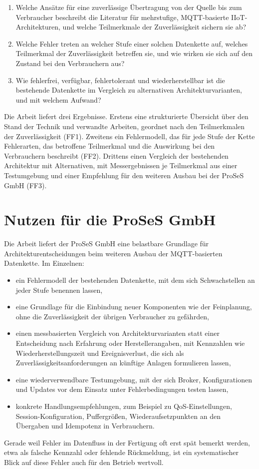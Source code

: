 \documentclass[11pt, a4paper]{article}
\begin{document}
\begin{enumerate}[label=\textbf{FF\arabic*}, leftmargin=*, nosep]
    \item Welche Ansätze für eine zuverlässige Übertragung von der Quelle bis zum Verbraucher beschreibt die Literatur für mehrstufige, MQTT-basierte IIoT-Architekturen, und welche Teilmerkmale der Zuverlässigkeit sichern sie ab?
    \item Welche Fehler treten an welcher Stufe einer solchen Datenkette auf, welches Teilmerkmal der Zuverlässigkeit betreffen sie, und wie wirken sie sich auf den Zustand bei den Verbrauchern aus?
    \item Wie fehlerfrei, verfügbar, fehlertolerant und wiederherstellbar ist die bestehende Datenkette im Vergleich zu alternativen Architekturvarianten, und mit welchem Aufwand?
\end{enumerate}

Die Arbeit liefert drei Ergebnisse. Erstens eine strukturierte Übersicht über den Stand der Technik und verwandte Arbeiten, geordnet nach den Teilmerkmalen der Zuverlässigkeit (FF1). Zweitens ein Fehlermodell, das für jede Stufe der Kette Fehlerarten, das betroffene Teilmerkmal und die Auswirkung bei den Verbrauchern beschreibt (FF2). Drittens einen Vergleich der bestehenden Architektur mit Alternativen, mit Messergebnissen je Teilmerkmal aus einer Testumgebung und einer Empfehlung für den weiteren Ausbau bei der ProSeS GmbH (FF3).

\section{Nutzen für die ProSeS GmbH}

Die Arbeit liefert der ProSeS GmbH eine belastbare Grundlage für Architekturentscheidungen beim weiteren Ausbau der MQTT-basierten Datenkette. Im Einzelnen:
\begin{itemize}[nosep]
    \item ein Fehlermodell der bestehenden Datenkette, mit dem sich Schwachstellen an jeder Stufe benennen lassen,
    \item eine Grundlage für die Einbindung neuer Komponenten wie der Feinplanung, ohne die Zuverlässigkeit der übrigen Verbraucher zu gefährden,
    \item einen messbasierten Vergleich von Architekturvarianten statt einer Entscheidung nach Erfahrung oder Herstellerangaben, mit Kennzahlen wie Wiederherstellungszeit und Ereignisverlust, die sich als Zuverlässigkeitsanforderungen an künftige Anlagen formulieren lassen,
    \item eine wiederverwendbare Testumgebung, mit der sich Broker, Konfigurationen und Updates vor dem Einsatz unter Fehlerbedingungen testen lassen,
    \item konkrete Handlungsempfehlungen, zum Beispiel zu QoS-Einstellungen, Session-Konfiguration, Puffergrößen, Wiederaufsetzpunkten an den Übergaben und Idempotenz in Verbrauchern.
\end{itemize}
Gerade weil Fehler im Datenfluss in der Fertigung oft erst spät bemerkt werden, etwa als falsche Kennzahl oder fehlende Rückmeldung, ist ein systematischer Blick auf diese Fehler auch für den Betrieb wertvoll.
\end{document}
